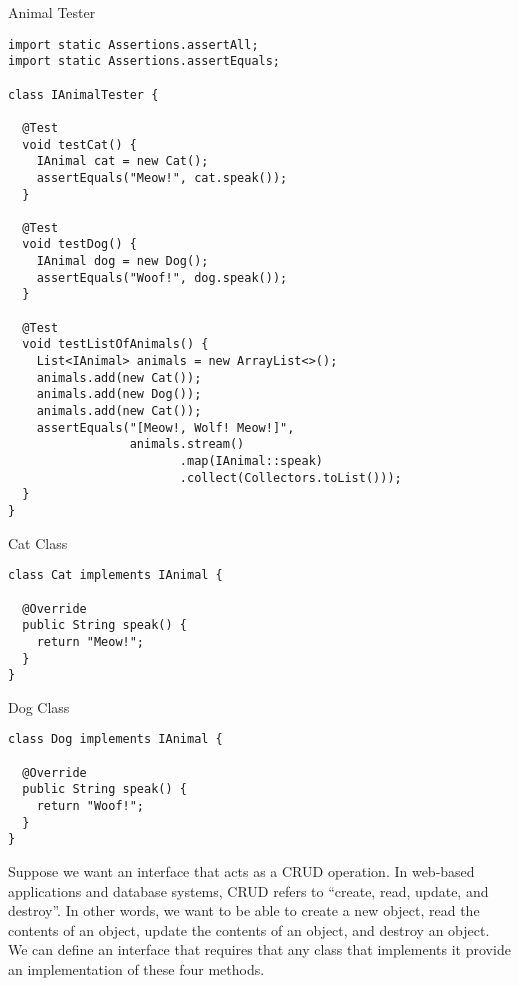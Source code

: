 \begin{cl}{Animal Tester}
\begin{lstlisting}[language=MyJava]
import static Assertions.assertAll;
import static Assertions.assertEquals;

class IAnimalTester {
  
  @Test
  void testCat() {
    IAnimal cat = new Cat();
    assertEquals("Meow!", cat.speak());
  }

  @Test
  void testDog() {
    IAnimal dog = new Dog();
    assertEquals("Woof!", dog.speak());
  }

  @Test
  void testListOfAnimals() {
    List<IAnimal> animals = new ArrayList<>();
    animals.add(new Cat());
    animals.add(new Dog());
    animals.add(new Cat());
    assertEquals("[Meow!, Wolf! Meow!]", 
                 animals.stream()
                        .map(IAnimal::speak)
                        .collect(Collectors.toList()));
  }
}
\end{lstlisting}
\end{cl}

\begin{cl}{Cat Class}
\begin{lstlisting}[language=MyJava]
class Cat implements IAnimal {

  @Override
  public String speak() {
    return "Meow!";
  }
}
\end{lstlisting}
\end{cl}

\begin{cl}{Dog Class}
\begin{lstlisting}[language=MyJava]
class Dog implements IAnimal {

  @Override
  public String speak() {
    return "Woof!";
  }
}
\end{lstlisting}
\end{cl}



\example Suppose we want an interface that acts as a CRUD operation. In web-based applications and database systems, CRUD refers to ``create, read, update, and destroy''. In other words, we want to be able to create a new object, read the contents of an object, update the contents of an object, and destroy an object. We can define an interface that requires that any class that implements it provide an implementation of these four methods. 


